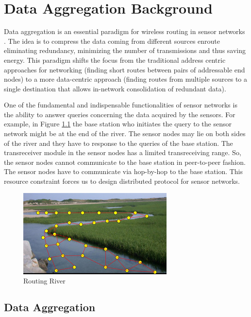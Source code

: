 \chapter{Data Aggregation Background} %
\label{cha:Data Aggregation Background}

	Data aggregation is an essential paradigm for wireless routing in sensor networks \cite{krishnamachari2002impact}. 
	The idea is to compress the data coming from different sources enroute eliminating redundancy, minimizing the number of transmissions and thus saving energy.
	This paradigm shifts the focus from the traditional address centric approaches for networking (finding short routes between pairs of addressable end nodes) to a more data-centric approach (finding routes from multiple sources to a single destination that allows in-network consolidation of redundant data).

	One of the fundamental and indispensable functionalities of sensor networks is the ability to answer queries concerning the data acquired by the sensors. 
	For example, in Figure \ref{fig:Routing River} \cite{RoutingRiver} the base station who initiates the query to the sensor network might be at the end of the river.
	The sensor nodes may lie on both sides of the river and they have to response to the queries of the base station.
	The transreceiver module in the sensor nodes has a limited transreceiving range. 
	So, the sensor nodes cannot communicate to the base station in peer-to-peer fashion.
	The sensor nodes have to communicate via hop-by-hop to the base station.
	This resource constraint forces us to design distributed protocol for sensor networks.  
	\begin{figure}[h!]
		\centering
		\includegraphics[scale = 2]{images/routing-river.jpg}
		\caption{Routing River}
		\label{fig:Routing River}
	\end{figure}

\section{Data Aggregation}


